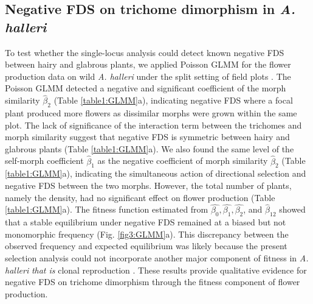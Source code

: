 \documentclass[12pt,]{article}
\begin{document}
\subsection{Negative FDS on trichome dimorphism in \textit{A. halleri}}
To test whether the single-locus analysis could detect known negative FDS between hairy and glabrous plants, we applied Poisson GLMM for the flower production data on wild \textit{A. halleri} under the split setting of field plots \citep{sato2017herbivore}. The Poisson GLMM detected a negative and significant coefficient of the morph similarity $\hat{\beta}_2$ (Table \ref{table1:GLMM}a), indicating negative FDS where a focal plant produced more flowers as dissimilar morphs were grown within the same plot. The lack of significance of the interaction term between the trichomes and morph similarity suggest that negative FDS is symmetric between hairy and glabrous plants (Table \ref{table1:GLMM}a). We also found the same level of the self-morph coefficient $\hat{\beta}_1$ as the negative coefficient of morph similarity $\hat{\beta}_2$ (Table \ref{table1:GLMM}a), indicating the simultaneous action of directional selection and negative FDS between the two morphs. However, the total number of plants, namely the density, had no significant effect on flower production (Table \ref{table1:GLMM}a). The fitness function estimated from $\hat{\beta_0}, \hat{\beta_1}, \hat{\beta_2}$, and $\hat{\beta}_{12}$ showed that a stable equilibrium under negative FDS remained at a biased but not monomorphic frequency (Fig. \ref{fig3:GLMM}a). This discrepancy between the observed frequency and expected equilibrium was likely because the present selection analysis could not incorporate another major component of fitness in \textit{A. halleri} \textit{that is} clonal reproduction \citep{sato2017herbivore}. These results provide qualitative evidence for negative FDS on trichome dimorphism through the fitness component of flower production.
\end{document}
